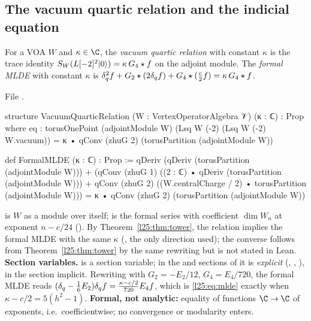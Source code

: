 \subsection{The vacuum quartic relation and the indicial equation}

\begin{definition}\label{l25:def:vqr}
For a VOA $W$ and $\kappa\in\C$, the \emph{vacuum quartic relation} with constant $\kappa$ is the trace identity
$S_W(L[-2]^2|0\rangle)=\kappa\,G_4\star f$ on the adjoint module. The \emph{formal MLDE} with constant $\kappa$ is
$\delta_q^2f+G_2\star(2\delta_q f)+G_4\star(\frac c2f)=\kappa\,G_4\star f$.
\end{definition}
\noindent File .
\begin{leancode}
structure VacuumQuarticRelation (W : VertexOperatorAlgebra 𝒱) (κ : ℂ) : Prop where
  eq : torusOnePoint (adjointModule W) (Lsq W (-2) (Lsq W (-2) W.vacuum))
    = κ • qConv (zhuG 2) (torusPartition (adjointModule W))

def FormalMLDE (κ : ℂ) : Prop :=
  qDeriv (qDeriv (torusPartition (adjointModule W)))
      + (qConv (zhuG 1) ((2 : ℂ) • qDeriv (torusPartition (adjointModule W)))
        + qConv (zhuG 2) ((W.centralCharge / 2) • torusPartition (adjointModule W)))
    = κ • qConv (zhuG 2) (torusPartition (adjointModule W))
\end{leancode}
\begin{dictionary}
 is $W$ as a module over itself;  is the formal series
with coefficient $\dim W_n$ at exponent $n-c/24$ (). By
Theorem~\ref{l25:thm:tower}, the relation implies the formal MLDE with the same $\kappa$
(, the only direction used); the converse follows from
Theorem~\ref{l25:thm:tower} by the same rewriting but is not stated in Lean. \textbf{Section variables.}
 is a section variable; in the  and  sections of
 it is \emph{explicit} (, ,
), in the  section implicit. Rewriting with
$G_2=-E_2/12$, $G_4=E_4/720$, the formal MLDE reads $(\delta_q-\frac16E_2)\delta_q f=\frac{\kappa-c/2}{720}E_4f$, which
is \eqref{l25:eq:mlde} exactly when $\kappa-c/2=5(h^2-1)$. \textbf{Formal, not analytic:} equality of functions
$\C\to\C$ of exponents, i.e.\ coefficientwise; no convergence or modularity enters.
\end{dictionary}
